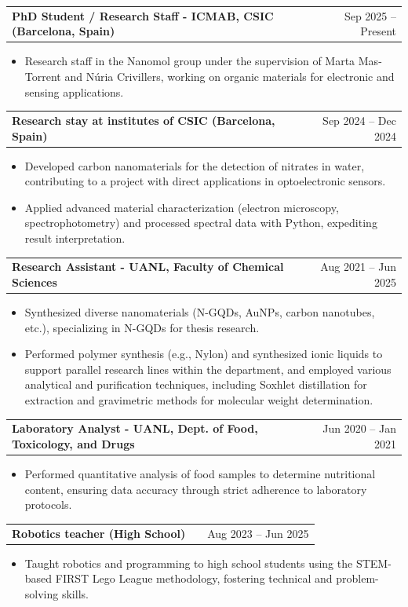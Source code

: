 \documentclass[a4paper,12pt]{article}
\makeatletter
\newenvironment{joblong}[2]
    {
    \begin{tabularx}{\linewidth}{@{}l X r@{}}
    \textbf{#1} & \hfill &  #2 \\[3.2pt]
    \end{tabularx}
    \begin{minipage}[t]{\linewidth}
    \begin{itemize}[nosep,after=\strut, leftmargin=1em, itemsep=2pt,label=--]
    }
    {
    \end{itemize}
    \end{minipage}    
    }
\makeatother
\begin{document}
\begin{joblong}{PhD Student / Research Staff - ICMAB, CSIC (Barcelona, Spain)}{Sep 2025 -- Present}
\item	Research staff in the Nanomol group under the supervision of Marta Mas-Torrent and Núria Crivillers, working on organic materials for electronic and sensing applications.
\end{joblong}

\begin{joblong}{Research stay at institutes of CSIC (Barcelona, Spain)}{Sep 2024 -- Dec 2024}
\item	Developed carbon nanomaterials for the detection of nitrates in water, contributing to a project with direct applications in optoelectronic sensors.
\item	Applied advanced material characterization (electron microscopy, spectrophotometry) and processed spectral data with Python, expediting result interpretation.
\end{joblong}

\begin{joblong}{Research Assistant - UANL, Faculty of Chemical Sciences}{Aug 2021 -- Jun 2025}
\item Synthesized diverse nanomaterials (N-GQDs, AuNPs, carbon nanotubes, etc.), specializing in N-GQDs for thesis research.
\item Performed polymer synthesis (e.g., Nylon) and synthesized ionic liquids to support parallel research lines within the department, and employed various analytical and purification techniques, including Soxhlet distillation for extraction and gravimetric methods for molecular weight determination.
\end{joblong}

\begin{joblong}{Laboratory Analyst - UANL, Dept. of Food, Toxicology, and Drugs}{Jun 2020 -- Jan 2021}
\item Performed quantitative analysis of food samples to determine nutritional content, ensuring data accuracy through strict adherence to laboratory protocols.
\end{joblong}

\begin{joblong}{Robotics teacher (High School)}{Aug 2023 -- Jun 2025}
\item	Taught robotics and programming to high school students using the STEM-based FIRST Lego League methodology, fostering technical and problem-solving skills.
\end{joblong}
\end{document}
